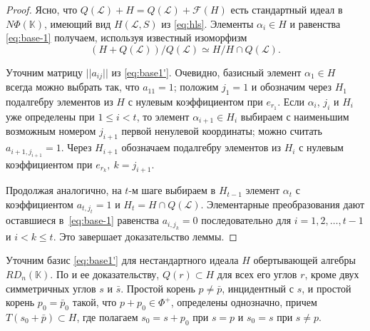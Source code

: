 \documentclass[a4paper,14pt,oneside,openany]{memoir}
\begin{document}
\begin{proof}
    Ясно, что $Q(\mathcal{L})+H=Q(\mathcal{L})+\mathcal{F}(H)$ есть стандартный
    идеал в $N\Phi(\mathbb{K})$, имеющий вид $H(\mathcal{L},S)$ из \eqref{eq:hls}.
    Элементы $\alpha_i\in H$ и равенства \eqref{eq:base-1} получаем, используя
    известный изоморфизм
    \[
        (H+Q(\mathcal{L})) / Q(\mathcal{L}) \simeq H / H \cap Q(\mathcal{L}).
    \]

    Уточним матрицу $||a_{ij}||$ из \eqref{eq:base1'}. Очевидно, базисный элемент
    $\alpha_1\in H$ всегда можно выбрать так, что $a_{11}=1$; положим $j_1=1$ и
    обозначим через $H_1$ подалгебру элементов из $H$ с нулевым коэффициентом при
    $e_{r_1}$. Если $\alpha_i$, $j_i$ и $H_i$ уже определены при $1\leq i<t$, то
    элемент $\alpha_{i+1}\in H_i$ выбираем с наименьшим возможным номером $j_{i+1}$
    первой ненулевой координаты; можно считать $a_{i+1,j_{i+1}}=1$. Через $H_{i+1}$
    обозначаем подалгебру элементов из $H_i$ с нулевым коэффициентом при $e_{r_k},
    \ k=j_{i+1}$.

    Продолжая аналогично, на $t$-м шаге выбираем в $H_{t-1}$ элемент $\alpha_{t}$ с
    коэффициентом $a_{t,j_t}=1$ и $H_{t}=H \cap Q(\mathcal{L})$. Элементарные
    преобразования дают оставшиеся в~\eqref{eq:base-1} равенства $a_{i,j_k}=0$
    последовательно для $i=1,2,\dots,t-1$ и $i<k\leq t$. Это завершает
    доказательство леммы.
\end{proof}

Уточним базис \eqref{eq:base1'} для нестандартного идеала $H$ обертывающей
алгебры $RD_n(\mathbb{K})$. По  и ее
доказательству, $Q(r)\subset H$ для всех его углов $r$, кроме двух симметричных
углов $s$ и $\bar{s}$. Простой корень $p \neq \bar{p}$, инцидентный с $s$, и
простой корень $p_0= \bar{p}_0$ такой, что $p+p_0\in\Phi^+$, определены
однозначно, причем $T(s_0 + \bar{p}) \subset H$, где полагаем $s_0=s+p_0$ при
$s=p$ и $s_0=s$ при $s\neq p$.

\medskip
\end{document}
